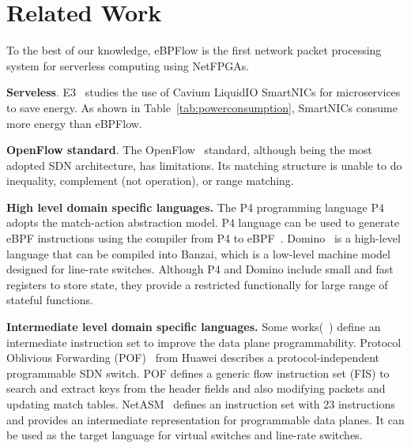 \section{Related Work}
\label{sec:relatedWork}

%

 To the best of our knowledge, eBPFlow is the first network packet processing system for serverless computing using NetFPGAs.


\textbf{Serveless}. E3~\cite{liu2019e3} studies the use of Cavium LiquidIO SmartNICs for microservices to save energy. As shown in Table~\ref{tab:powerconsumption}, SmartNICs consume more energy than eBPFlow.

\textbf{OpenFlow standard}. The OpenFlow~\cite{McKeown:2008:OpenFlow} standard, although being the most adopted SDN architecture, has limitations. Its matching structure is unable to do inequality, complement (not operation), or range matching. 


\textbf{High level domain specific languages.} The P4 programming language P4~\cite{Bosshart:2014:P4} adopts the match-action abstraction model. 
P4 language can be used to generate eBPF instructions using the compiler from P4 to eBPF~\cite{P42EBPF2015}. Domino~\cite{Sivaraman:2016:PTH:2934872.2934900} is a high-level language that can be compiled into Banzai, which is a low-level machine model designed for line-rate switches. 
Although P4 and Domino include small and fast registers to store state, they provide a restricted functionally for large range of stateful functions.

\textbf{Intermediate level domain specific languages.} Some works(~\cite{Song:2013:POF:2491185.2491190,Shahbaz:2015:NetASM,Sivaraman:2016:PTH:2934872.2934900}) define an intermediate instruction set to improve the data plane programmability.
Protocol Oblivious Forwarding (POF)~\cite{Song:2013:POF:2491185.2491190} from Huawei describes a protocol-independent programmable SDN switch. POF defines a generic flow instruction set (FIS) to search and extract keys from the header fields and also modifying packets and updating match tables. NetASM~\cite{Shahbaz:2015:NetASM} defines an instruction set with 23 instructions and provides an intermediate representation for programmable data planes. It can be used as the target language for virtual switches and line-rate switches. 

